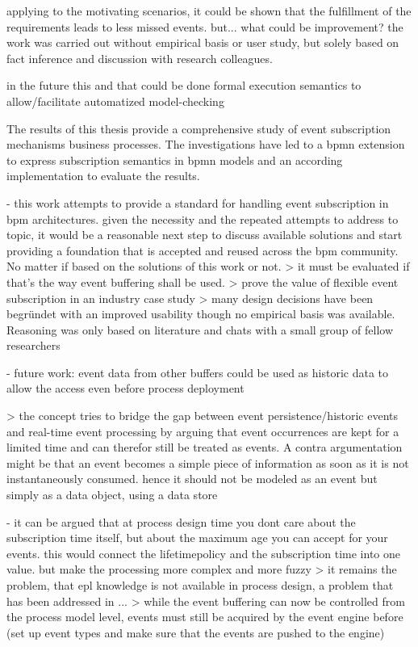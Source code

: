 applying to the motivating scenarios, it could be shown that the fulfillment of the requirements leads to less missed events.
but...
what could be improvement?
the work was carried out without empirical basis or user study, but solely based on fact inference and discussion with research colleagues.

in the future this and that could be done
formal execution semantics to allow/facilitate automatized model-checking

The results of this thesis provide a comprehensive study of event subscription mechanisms business processes. 
The investigations have led to a bpmn extension to express subscription semantics in bpmn models and an according implementation to evaluate the results.


- this work attempts to provide a standard for handling event subscription in bpm architectures. given the necessity and the repeated attempts to address to topic, it would be a reasonable next step to discuss available solutions and start providing a foundation that is accepted and reused across the bpm community. No matter if based on the solutions of this work or not.
> it must be evaluated if that's the way event buffering shall be used. > prove the value of flexible event subscription in an industry case study
> many design decisions have been begründet with an improved usability though no empirical basis was available. Reasoning was only based on literature and chats with a small group of fellow researchers

- future work: event data from other buffers could be used as historic data to allow the access even before process deployment

> the concept tries to bridge the gap between event persistence/historic events and real-time event processing by arguing that event occurrences are kept for a limited time and can therefor still be treated as events. A contra argumentation might be that an event becomes a simple piece of information as soon as it is not instantaneously consumed. hence it should not be modeled as an event but simply as a data object, using a data store


- it can be argued that at process design time you dont care about the subscription time itself, but about the maximum age you can accept for your events. this would connect the lifetimepolicy and the subscription time into one value. but make the processing more complex and more fuzzy
> it remains the problem, that epl knowledge is not available in process design, a problem that has been addressed in ...
> while the event buffering can now be controlled from the process model level, events must still be acquired by the event engine before (set up event types and make sure that the events are pushed to the engine)

